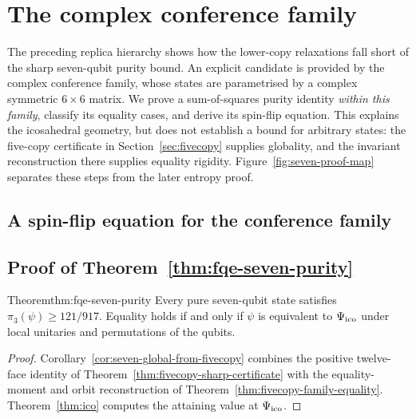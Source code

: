 


\section{The complex conference family}\label{sec:sup-conference}
The preceding replica hierarchy shows how the lower-copy relaxations fall
short of the sharp seven-qubit purity bound. An explicit candidate is
provided by the complex conference family, whose states are parametrised
by a complex symmetric $6\times6$ matrix. We prove a sum-of-squares
purity identity \emph{within this family}, classify its equality cases,
and derive its spin-flip equation. This explains the icosahedral geometry,
but does not establish a bound for arbitrary states: the five-copy
certificate in Section~\ref{sec:fivecopy} supplies globality, and the
invariant reconstruction there supplies equality rigidity.
Figure~\ref{fig:seven-proof-map} separates these steps from the later
entropy proof.


\subsection{A spin-flip equation for the conference family}\label{sec:sup-conference-shell}








\subsection{Proof of Theorem~\ref{thm:fqe-seven-purity}}\label{sec:sup-seven-purity}
\begin{restated}{Theorem}{thm:fqe-seven-purity}
Every pure seven-qubit state satisfies $\pi_3(\psi)\ge121/917$. Equality holds if and only if $\psi$ is
equivalent to $\Psi_{\mathrm{ico}}$ under local unitaries and permutations of the qubits.
\end{restated}
\begin{proof}
Corollary~\ref{cor:seven-global-from-fivecopy} combines the positive
twelve-face identity of Theorem~\ref{thm:fivecopy-sharp-certificate}
with the equality-moment and orbit reconstruction of
Theorem~\ref{thm:fivecopy-family-equality}.
Theorem~\ref{thm:ico} computes the attaining value at $\Psi_{\mathrm{ico}}$.
\end{proof}


